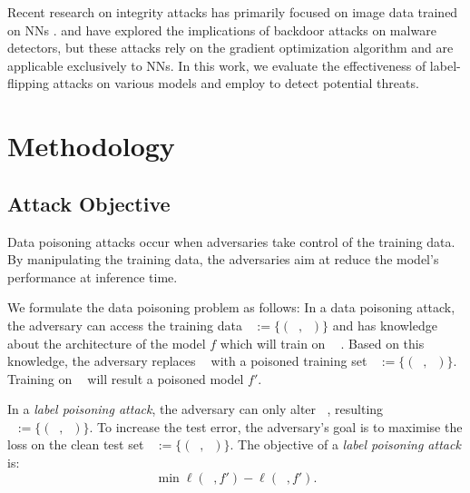 \documentclass[runningheads]{llncs}
\DeclareMathOperator*{\Xtr}{\mathcal{X}_\text{train}}
\DeclareMathOperator*{\ytr}{\mathcal{Y}_\text{train}}
\DeclareMathOperator*{\Xte}{\mathcal{X}_\text{test}}
\DeclareMathOperator*{\yte}{\mathcal{Y}_\text{test}}
\DeclareMathOperator*{\Xpo}{\mathcal{X}^\prime_\text{train}}
\DeclareMathOperator*{\ypo}{\mathcal{Y}^\prime_\text{train}}
\DeclareMathOperator*{\Dpo}{\mathcal{D}^\prime_\text{train}}
\DeclareMathOperator*{\Dtr}{\mathcal{D}_\text{train}}
\DeclareMathOperator*{\Dte}{\mathcal{D}_\text{test}}
\begin{document}
Recent research on integrity attacks has primarily focused on image data trained on NNs \citep{aryal2022analysis}. 
\cite{sasaki2019embedding} and \cite{li2021backdoor} have explored the implications of backdoor attacks on malware detectors, but these attacks rely on the gradient optimization algorithm and are applicable exclusively to NNs. 
In this work, we evaluate the effectiveness of label-flipping attacks on various models and employ \diva to detect potential threats.

\section{Methodology}
\label{sec:methodology}

\subsection{Attack Objective}
\label{sec:method:objective}

Data poisoning attacks occur when adversaries take control of the training data.
By manipulating the training data, the adversaries aim at reduce the model's performance at inference time.

We formulate the data poisoning problem as follows:
In a data poisoning attack, the adversary can access the training data $\Dtr:=\{(\Xtr, \ytr)\}$ and has knowledge about the architecture of the model $f$ which will train on $\Dtr$ \cite{cina2022wild}. 
Based on this knowledge, the adversary replaces $\Dtr$ with a poisoned training set $\Dpo:=\{(\Xpo, \ypo)\}$.
Training on $\Dpo$ will result a poisoned model $f'$.

In a \emph{label poisoning attack}, the adversary can only alter $\ytr$, resulting $\Dpo:=\{(\Xtr, \ypo)\}$.
To increase the test error, the adversary's goal is to maximise the loss on the clean test set $\Dte:=\{(\Xte, \yte)\}$.
The objective of a \emph{label poisoning attack} \cite{munoz2017towards} is:
\begin{equation}
    \min_{\Dpo} \ell(\Dpo, f') - \ell(\Dte, f').
    \label{eq1}
\end{equation}
\end{document}
